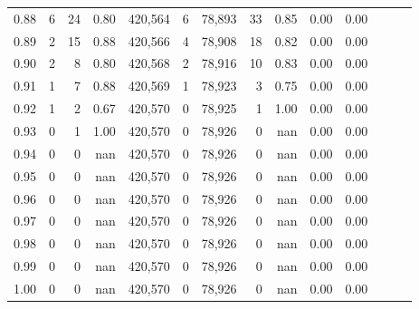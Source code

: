 \begin{tabular}{rrrrrrrrrrrrrr}
0.88 &       6 &     24 &  0.80 &  420,564 &        6 &  78,893 &      33 &  0.85 &  0.00 &      0.00 \\
0.89 &       2 &     15 &  0.88 &  420,566 &        4 &  78,908 &      18 &  0.82 &  0.00 &      0.00 \\
0.90 &       2 &      8 &  0.80 &  420,568 &        2 &  78,916 &      10 &  0.83 &  0.00 &      0.00 \\
0.91 &       1 &      7 &  0.88 &  420,569 &        1 &  78,923 &       3 &  0.75 &  0.00 &      0.00 \\
0.92 &       1 &      2 &  0.67 &  420,570 &        0 &  78,925 &       1 &  1.00 &  0.00 &      0.00 \\
0.93 &       0 &      1 &  1.00 &  420,570 &        0 &  78,926 &       0 &   nan &  0.00 &      0.00 \\
0.94 &       0 &      0 &   nan &  420,570 &        0 &  78,926 &       0 &   nan &  0.00 &      0.00 \\
0.95 &       0 &      0 &   nan &  420,570 &        0 &  78,926 &       0 &   nan &  0.00 &      0.00 \\
0.96 &       0 &      0 &   nan &  420,570 &        0 &  78,926 &       0 &   nan &  0.00 &      0.00 \\
0.97 &       0 &      0 &   nan &  420,570 &        0 &  78,926 &       0 &   nan &  0.00 &      0.00 \\
0.98 &       0 &      0 &   nan &  420,570 &        0 &  78,926 &       0 &   nan &  0.00 &      0.00 \\
0.99 &       0 &      0 &   nan &  420,570 &        0 &  78,926 &       0 &   nan &  0.00 &      0.00 \\
1.00 &       0 &      0 &   nan &  420,570 &        0 &  78,926 &       0 &   nan &  0.00 &      0.00 \\
\bottomrule
\end{tabular}
